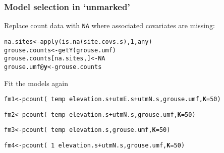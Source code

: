 \documentclass[color=usenames,dvipsnames]{beamer}\usepackage[]{graphicx}\usepackage[]{color}
\makeatletter
\newcommand{\hlnum}[1]{\textcolor[rgb]{0.69,0.494,0}{#1}}%
\newcommand{\hlopt}[1]{\textcolor[rgb]{0,0,0}{#1}}%
\newcommand{\hlstd}[1]{\textcolor[rgb]{0,0,0}{#1}}%
\newcommand{\hlkwb}[1]{\textcolor[rgb]{0,0.341,0.682}{#1}}%
\newcommand{\hlkwc}[1]{\textcolor[rgb]{0,0,0}{\textbf{#1}}}%
\newcommand{\hlkwd}[1]{\textcolor[rgb]{0.004,0.004,0.506}{#1}}%
\newenvironment{kframe}{%
 \def\at@end@of@kframe{}%
 \ifinner\ifhmode%
  \def\at@end@of@kframe{\end{minipage}}%
  \begin{minipage}{\columnwidth}%
 \fi\fi%
 \def\FrameCommand##1{\hskip\@totalleftmargin \hskip-\fboxsep
 \colorbox{shadecolor}{##1}\hskip-\fboxsep
     \hskip-\linewidth \hskip-\@totalleftmargin \hskip\columnwidth}%
 \MakeFramed {\advance\hsize-\width
   \@totalleftmargin\z@ \linewidth\hsize
   \@setminipage}}%
 {\par\unskip\endMakeFramed%
 \at@end@of@kframe}
\newenvironment{knitrout}{}{} %
\newcommand{\inr}[1]{\colorbox{inlinecolor}{\texttt{#1}}}
\makeatother
\begin{document}
\begin{frame}[fragile]
  \frametitle{Model selection in `unmarked'}
  \small
  Replace count data with \inr{NA} where associated covariates are missing:
  \vspace{-6pt}
\begin{knitrout}\footnotesize
{}\color{fgcolor}\begin{kframe}
\begin{alltt}
\hlstd{na.sites} \hlkwb{<-} \hlkwd{apply}\hlstd{(}\hlkwd{is.na}\hlstd{(site.covs.s),} \hlnum{1}\hlstd{, any)}
\hlstd{grouse.counts} \hlkwb{<-} \hlkwd{getY}\hlstd{(grouse.umf)}
\hlstd{grouse.counts[na.sites,]} \hlkwb{<-} \hlnum{NA}
\hlstd{grouse.umf}\hlopt{@}\hlkwc{y} \hlkwb{<-} \hlstd{grouse.counts}
\end{alltt}
\end{kframe}
\end{knitrout}
  \pause
  \vfill
  Fit the models again
  \vspace{-6pt}
\begin{knitrout}\scriptsize
{}\color{fgcolor}\begin{kframe}
\begin{alltt}
\hlstd{fm1} \hlkwb{<-} \hlkwd{pcount}\hlstd{(}\hlopt{~}\hlstd{temp} \hlopt{~} \hlstd{elevation.s}\hlopt{+}\hlstd{utmE.s}\hlopt{+}\hlstd{utmN.s, grouse.umf,} \hlkwc{K}\hlstd{=}\hlnum{50}\hlstd{)}
\end{alltt}


{\ttfamily\noindent\bfseries{}}\begin{alltt}
\hlstd{fm2} \hlkwb{<-} \hlkwd{pcount}\hlstd{(}\hlopt{~}\hlstd{temp} \hlopt{~} \hlstd{elevation.s}\hlopt{+}\hlstd{utmN.s, grouse.umf,} \hlkwc{K}\hlstd{=}\hlnum{50}\hlstd{)}
\end{alltt}


{\ttfamily\noindent\bfseries{}}\begin{alltt}
\hlstd{fm3} \hlkwb{<-} \hlkwd{pcount}\hlstd{(}\hlopt{~}\hlstd{temp} \hlopt{~} \hlstd{elevation.s, grouse.umf,} \hlkwc{K}\hlstd{=}\hlnum{50}\hlstd{)}
\end{alltt}


{\ttfamily\noindent\bfseries{}}\begin{alltt}
\hlstd{fm4} \hlkwb{<-} \hlkwd{pcount}\hlstd{(}\hlopt{~}\hlnum{1} \hlopt{~} \hlstd{elevation.s}\hlopt{+}\hlstd{utmN.s, grouse.umf,} \hlkwc{K}\hlstd{=}\hlnum{50}\hlstd{)}
\end{alltt}



\end{kframe}
\end{knitrout}
\end{frame}
\end{document}
